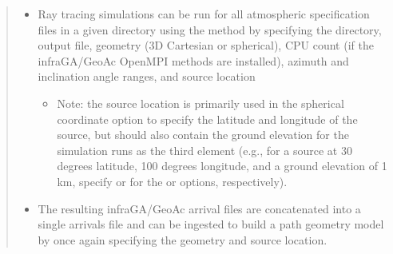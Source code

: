 \documentclass[letterpaper,10pt,english]{sphinxmanual}
\begin{document}
\begin{itemize}
\begin{quote}
\begin{itemize}
\item {} 
Ray tracing simulations can be run for all atmospheric specification files in a given directory using the  method by specifying the directory, output file, geometry (3D Cartesian or spherical), CPU count (if the infraGA/GeoAc OpenMPI methods are installed), azimuth and inclination angle ranges, and source location
\begin{itemize}
\item {} 
Note: the source location is primarily used in the spherical coordinate option to specify the latitude and longitude of the source, but should also contain the ground elevation for the simulation runs as the third element (e.g., for a source at 30 degrees latitude, 100 degrees longitude, and a ground elevation of 1 km, specify  or  for the  or  options, respectively).

\end{itemize}

\end{itemize}

\begin{sphinxVerbatim}[commandchars=\\\{\}]
   

    \PYG{p}{[}  \PYG{p}{]}  
\end{sphinxVerbatim}
\begin{itemize}
\item {} 
The resulting infraGA/GeoAc arrival files are concatenated into a single arrivals file and can be ingested to build a path geometry model by once again specifying the geometry and source location.


\end{itemize}
\end{quote}
\end{itemize}
\end{document}
